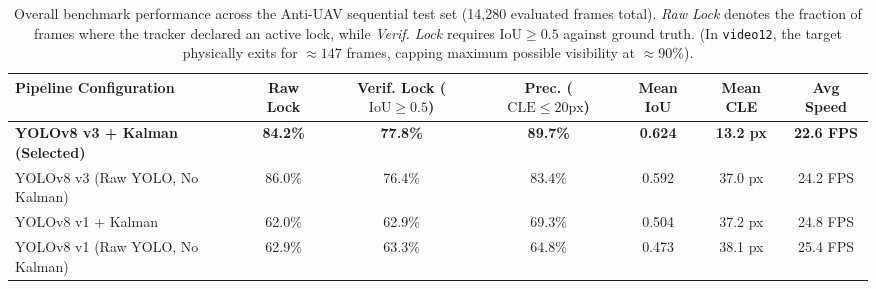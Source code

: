 \documentclass[11pt,a4paper]{article}
\begin{document}
\begin{table}[h!]
\centering
\small
\begin{tabular}{lcccccc}
\toprule
\textbf{Pipeline Configuration} & \textbf{Raw Lock} & \textbf{Verif. Lock ($\text{IoU} \ge 0.5$)} & \textbf{Prec. ($\text{CLE} \le 20\text{px}$)} & \textbf{Mean IoU} & \textbf{Mean CLE} & \textbf{Avg Speed} \\
\midrule
\textbf{YOLOv8 v3 + Kalman (Selected)} & \textbf{84.2\%} & \textbf{77.8\%} & \textbf{89.7\%} & \textbf{0.624} & \textbf{13.2 px} & \textbf{22.6 FPS} \\
YOLOv8 v3 (Raw YOLO, No Kalman)       & 86.0\%          & 76.4\%          & 83.4\%                 & 0.592             & 37.0 px           & 24.2 FPS \\
YOLOv8 v1 + Kalman                     & 62.0\%          & 62.9\%          & 69.3\%                 & 0.504             & 37.2 px           & 24.8 FPS \\
YOLOv8 v1 (Raw YOLO, No Kalman)       & 62.9\%          & 63.3\%          & 64.8\%                 & 0.473             & 38.1 px           & 25.4 FPS \\
\bottomrule
\end{tabular}
\caption{Overall benchmark performance across the Anti-UAV sequential test set (14,280 evaluated frames total). \textit{Raw Lock} denotes the fraction of frames where the tracker declared an active lock, while \textit{Verif. Lock} requires $\text{IoU} \ge 0.5$ against ground truth. (In \texttt{video12}, the target physically exits for $\approx 147$ frames, capping maximum possible visibility at $\approx 90\%$).}
\label{tab:benchmark_summary}
\end{table}
\end{document}
